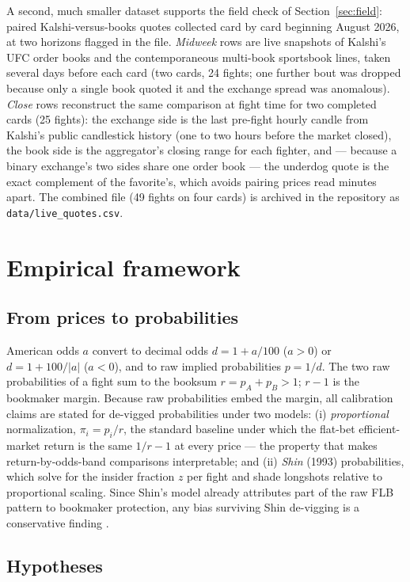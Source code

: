 \documentclass[11pt]{article}
\newcommand{\devig}{de-vigged}
\begin{document}
A second, much smaller dataset supports the field check of Section~\ref{sec:field}: paired
Kalshi-versus-books quotes collected card by card beginning August 2026, at two horizons flagged
in the file. \emph{Midweek} rows are live snapshots of Kalshi's UFC order books and the
contemporaneous multi-book sportsbook lines, taken several days before each card (two cards, 24
fights; one further bout was dropped because only a single book quoted it and the exchange spread
was anomalous). \emph{Close} rows reconstruct the same comparison at fight time for two completed
cards (25 fights): the exchange side is the last pre-fight hourly candle from Kalshi's public
candlestick history (one to two hours before the market closed), the book side is the
aggregator's closing range for each fighter, and --- because a binary exchange's two sides share
one order book --- the underdog quote is the exact complement of the favorite's, which avoids
pairing prices read minutes apart. The combined file (49 fights on four cards) is archived in the
repository as \texttt{data/live\_quotes.csv}.

\section{Empirical framework}

\subsection{From prices to probabilities}

American odds $a$ convert to decimal odds $d = 1 + a/100$ ($a>0$) or $d = 1 + 100/|a|$ ($a<0$),
and to raw implied probabilities $p = 1/d$. The two raw probabilities of a fight sum to the
booksum $r = p_A + p_B > 1$; $r-1$ is the bookmaker margin. Because raw probabilities embed the
margin, all calibration claims are stated for \devig{} probabilities under two models: (i)
\emph{proportional} normalization, $\pi_i = p_i / r$, the standard baseline under which the
flat-bet efficient-market return is the same $1/r - 1$ at every price --- the property that makes
return-by-odds-band comparisons interpretable; and (ii) \emph{Shin} (1993) probabilities, which
solve for the insider fraction $z$ per fight and shade longshots relative to proportional
scaling. Since Shin's model already attributes part of the raw FLB pattern to bookmaker
protection, any bias surviving Shin de-vigging is a conservative finding \citep{strumbelj2014}.

\subsection{Hypotheses}
\end{document}

